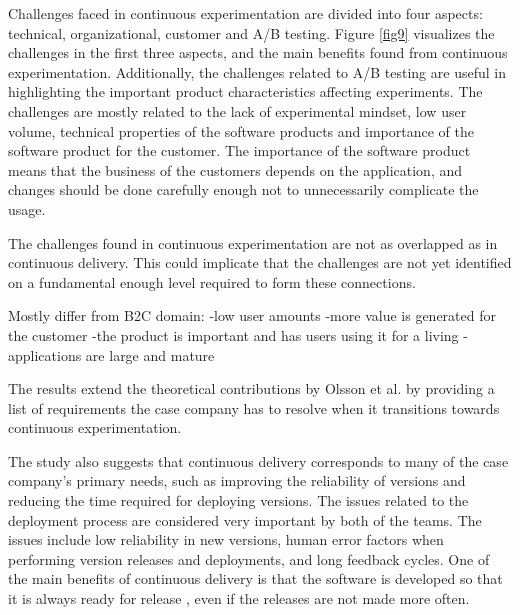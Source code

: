 \documentclass[english]{tktltiki2}
\theoremstyle{definition}
\theoremstyle{remark}
\begin{document}
Challenges faced in continuous experimentation are divided into four aspects: technical, organizational, customer and A/B testing. Figure \ref{fig9} visualizes the challenges in the first three aspects, and the main benefits found from continuous experimentation. Additionally, the challenges related to A/B testing are useful in highlighting the important product characteristics affecting experiments. The challenges are mostly related to the lack of experimental mindset, low user volume, technical properties of the software products and importance of the software product for the customer. The importance of the software product means that the business of the customers depends on the application, and changes should be done carefully enough not to unnecessarily complicate the usage. 

The challenges found in continuous experimentation are not as overlapped as in continuous delivery. This could implicate that the challenges are not yet identified on a fundamental enough level required to form these connections. 

Mostly differ from B2C domain:
-low user amounts
-more value is generated for the customer
-the product is important and has users using it for a living
-applications are large and mature



The results extend the theoretical contributions by Olsson et al. \cite{olsson2012climbing} by providing a list of requirements the case company has to resolve when it transitions towards continuous experimentation. 



The study also suggests that continuous delivery corresponds to many of the case company's primary needs, such as improving the reliability of versions and reducing the time required for deploying versions. The issues related to the deployment process are considered very important by both of the teams. The issues include low reliability in new versions, human error factors when performing version releases and deployments, and long feedback cycles. One of the main benefits of continuous delivery is that the software is developed so that it is always ready for release \cite{cdbook}, even if the releases are not made more often. 
\end{document}
